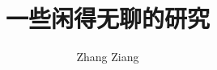 \documentclass{article}
\begin{document}
\title{\textbf{一些闲得无聊的研究}}
\author{Zhang Ziang} 
\maketitle
\tableofcontents


\newpage


\newpage

\end{document}
